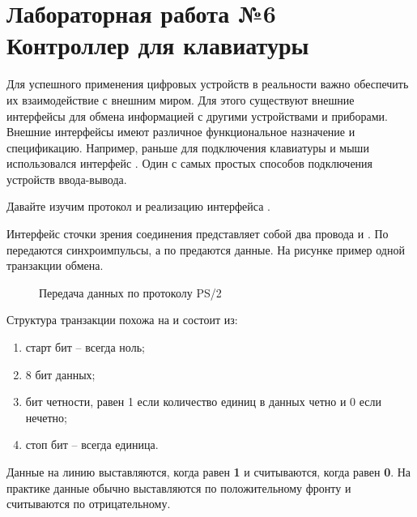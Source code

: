 \chapter{Лабораторная работа №6\\Контроллер  для клавиатуры} 

\par{Для успешного применения цифровых устройств в реальности важно обеспечить их взаимодействие с внешним миром. Для этого существуют внешние интерфейсы для обмена информацией с другими устройствами и приборами. Внешние интерфейсы имеют различное функциональное назначение и спецификацию. Например, раньше для подключения клавиатуры и мыши использовался интерфейс . Один с самых простых способов подключения устройств ввода-вывода.}

\vspace{4mm}

\par{Давайте изучим протокол и реализацию интерфейса .}

\par{Интерфейс  сточки зрения соединения представляет собой два провода  и . По  передаются синхроимпульсы, а по  предаются данные. На рисунке пример одной транзакции обмена.}

\begin{figure}[H]
	\centering
	\def\svgwidth{\columnwidth}
	
	\caption{Передача данных по протоколу PS/2}
\end{figure}

\par{Структура транзакции похожа на  и состоит из:}
  \begin{enumerate}[noitemsep,topsep=0pt, after=\vspace{2pt}]
    \item старт бит – всегда ноль;
    \item 8 бит данных;
    \item бит четности, равен 1 если количество единиц в данных четно и 0 если нечетно;
    \item стоп бит – всегда единица.
  \end{enumerate}

\par{Данные на линию выставляются, когда  равен \textbf{1} и считываются, когда  равен \textbf{0}. На практике данные обычно выставляются по положительному фронту и считываются по отрицательному.}

